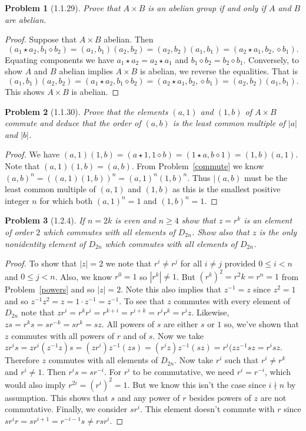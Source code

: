 \documentclass{article}
\newtheorem{problem}{Problem}
\begin{document}
\begin{problem}[1.1.29]
Prove that $A \times B$ is an abelian group if and only if $A$ and $B$ are abelian.
\end{problem}
\begin{proof}
Suppose that $A \times B$ abelian. Then
\[
(a_1 \star a_2, b_1 \diamond b_2) = (a_1,b_1)(a_2,b_2) = (a_2,b_2)(a_1,b_1) = (a_2 \star a_1, b_2, \diamond b_1).
\]
Equating components we have $a_1 \star a_2 = a_2 \star a_1$ and $b_1 \diamond b_2 = b_2 \diamond b_1$. Conversely, to show $A$ and $B$ abelian implies $A \times B$ is abelian, we reverse the equalities. That is
\[
(a_1,b_1)(a_2,b_2) = (a_1 \star a_2, b_1 \diamond b_2) = (a_2 \star a_1, b_2, \diamond b_1) = (a_2,b_2)(a_1,b_1).
\]
This shows $A \times B$ is abelian.
\end{proof}

\begin{problem}[1.1.30]
Prove that the elements $(a,1)$ and $(1,b)$ of $A \times B$ commute and deduce that the order of $(a,b)$ is the least common multiple of $|a|$ and $|b|$.
\end{problem}
\begin{proof}
We have $(a,1)(1,b) = (a \star 1, 1 \diamond b) = (1 \star a, b \diamond 1) = (1,b)(a,1)$. Note that $(a,1)(1,b) = (a,b)$. From Problem~\ref{commute} we know $(a,b)^n = ((a,1)(1,b))^n = (a,1)^n(1,b)^n$. Thus $|(a,b)$ must be the least common multiple of $(a,1)$ and $(1,b)$ as this is the smallest positive integer $n$ for which both $(a,1)^n = 1$ and $(1,b)^n = 1$.
\end{proof}

\begin{problem}[1.2.4]
If $n = 2k$ is even and $n \geq 4$ show that $z = r^k$ is an element of order $2$ which commutes with all elements of $D_{2n}$. Show also that $z$ is the only nonidentity element of $D_{2n}$ which commutes with all elements of $D_{2n}$.
\end{problem}
\begin{proof}
To show that $|z| = 2$ we note that $r^i \neq r^j$ for all $i \neq j$ provided $0 \leq i < n$ and $0 \leq j < n$. Also, we know $r^0 = 1$ so $|r^k| \neq 1$. But $(r^k)^2 = r^2k = r^n = 1$ from Problem~\ref{powers} and so $|z| = 2$. Note this also implies that $z^{-1} = z$ since $z^2 = 1$ and so $z^{-1}z^2 = z = 1 \cdot z^{-1} = z^{-1}$. To see that $z$ commutes with every element of $D_{2n}$ note that $zr^{i} = r^kr^i = r^{k+i} = r^{i+k} = r^ir^k = r^iz$. Likewise, $zs = r^ks = sr^{-k} = sr^k = sz$. All powers of $s$ are either $s$ or $1$ so, we've shown that $z$ commutes with all powers of $r$ and of $s$. Now we take $zr^is = zr^i(z^{-1}z)s = (zr^i)z^{-1}(zs) = (r^iz)z^{-1}(sz) = r^i(zz^{-1}sz = r^isz$. Therefore $z$ commutes with all elements of $D_{2n}$. Now take $r^i$ such that $r^i \neq r^k$ and $r^i \neq 1$. Then $r^is = sr^{-i}$. For $r^i$ to be commutative, we need $r^i = r^{-i}$, which would also imply $r^{2i} = (r^i)^2 = 1$. But we know this isn't the case since $i \nmid n$ by assumption. This shows that $s$ and any power of $r$ besides powers of $z$ are not commutative. Finally, we consider $sr^i$. This element doesn't commute with $r$ since $sr^ir = sr^{i+1} = r^{-i-1}s \neq rsr^i$.
\end{proof}
\end{document}
